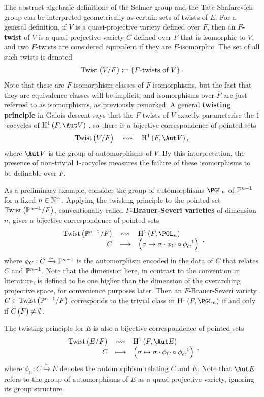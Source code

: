 The abstract algebraic definitions of the Selmer group and the Tate-Shafarevich group can be interpreted geometrically as certain sets of twists of $ E $. For a general definition, if $ V $ is a quasi-projective variety defined over $ F $, then an \textbf{$ F $-twist} of $ V $ is a quasi-projective variety $ C $ defined over $ F $ that is isomorphic to $ V $, and two $ F $-twists are considered equivalent if they are $ F $-isomorphic. The set of all such twists is denoted
$$ \Twist{V}{F} \coloneqq \cbr{\text{$ F $-twists of} \ V}. $$
Note that these are $ F $-isomorphism classes of $ \overline{F} $-isomorphisms, but the fact that they are equivalence classes will be implicit, and isomorphisms over $ \overline{F} $ are just referred to as isomorphisms, as previously remarked. A general \textbf{twisting principle} in Galois descent says that the $ F $-twists of $ V $ exactly parameterise the $ 1 $-cocycles of $ \H^1\br{F, \Aut V} $ \cite[Proposition X.4]{Ser80}, so there is a bijective correspondence of pointed sets
$$ \Twist{V}{F} \quad \leftrightsquigarrow \quad \H^1\br{F, \Aut V}, $$
where $ \Aut V $ is the group of automorphisms of $ V $. By this interpretation, the presence of non-trivial $ 1 $-cocycles measures the failure of these isomorphisms to be definable over $ F $.

As a preliminary example, consider the group of automorphisms $ \PGL_n $ of $ \mathbb{P}^{n - 1} $ for a fixed $ n \in \mathbb{N}^+ $. Applying the twisting principle to the pointed set $ \Twist{\PP^{n - 1}}{F} $, conventionally called \textbf{$ F $-Brauer-Severi varieties} of dimension $ n $, gives a bijective correspondence of pointed sets \cite[Section X.6]{Ser80}
$$ \bijection{\Twist{\PP^{n - 1}}{F}}{\H^1\br{F, \PGL_n}}{C}{\br{\sigma \mapsto \sigma \cdot \phi_C \circ \phi_C^{-1}}}, $$
where $ \phi_C : C \xrightarrow{\sim} \mathbb{P}^{n - 1} $ is the automorphism encoded in the data of $ C $ that relates $ C $ and $ \mathbb{P}^{n - 1} $. Note that the dimension here, in contrast to the convention in literature, is defined to be one higher than the dimension of the overarching projective space, for convenience purposes later. Then an $ F $-Brauer-Severi variety $ C \in \Twist{\PP^{n - 1}}{F} $ corresponds to the trivial class in $ \H^1\br{F, \PGL_n} $ if and only if $ C\br{F} \ne \emptyset $.

The twisting principle for $ E $ is also a bijective correspondence of pointed sets \cite[Theorem X.2.2]{Sil09}
$$ \bijection{\Twist{E}{F}}{\H^1\br{F, \Aut E}}{C}{\br{\sigma \mapsto \sigma \cdot \phi_C \circ \phi_C^{-1}}}, $$
where $ \phi_C : C \xrightarrow{\sim} E $ denotes the automorphism relating $ C $ and $ E $. Note that $ \Aut E $ refers to the group of automorphisms of $ E $ as a quasi-projective variety, ignoring its group structure.

